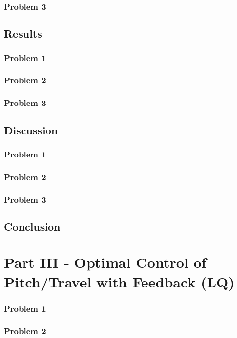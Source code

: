 \documentclass[12pt, a4paper]{article}%
\begin{document}
\subsubsection*{Problem 3}

\subsection*{Results}
\subsubsection*{Problem 1}
\subsubsection*{Problem 2}
\subsubsection*{Problem 3}

\subsection*{Discussion}
\subsubsection*{Problem 1}
\subsubsection*{Problem 2}
\subsubsection*{Problem 3}

\subsection*{Conclusion}

\section{Part III - Optimal Control of Pitch/Travel with Feedback (LQ)}
\subsubsection*{Problem 1}
\subsubsection*{Problem 2}
\end{document}
